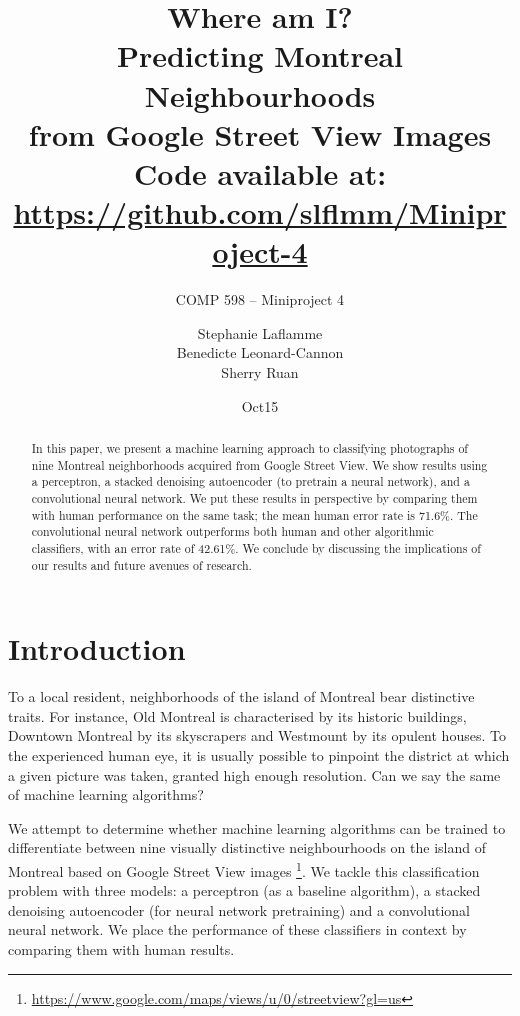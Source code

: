 \documentclass{acm_proc_article-sp}
\begin{document}
\title{Where am I? \\ Predicting Montreal Neighbourhoods \\from Google Street View Images  \\
{\normalsize Code available at: \url{https://github.com/slflmm/Miniproject-4}}} 
\subtitle{COMP 598 -- Miniproject 4}

\author{
\alignauthor 
Stephanie Laflamme\\
\alignauthor
Benedicte Leonard-Cannon\\
\alignauthor Sherry Ruan\\
}

\date{Oct15}



\maketitle
\begin{abstract}
In this paper, we present a machine learning approach to classifying photographs of nine Montreal neighborhoods acquired from Google Street View. We show results using a perceptron, a stacked denoising autoencoder (to pretrain a neural network), and a convolutional neural network. We put these results in perspective by comparing them with human performance on the same task; the mean human error rate is 71.6\%. The convolutional neural network outperforms both human and other algorithmic classifiers, with an error rate of 42.61\%. We conclude by discussing the implications of our results and future avenues of research. 


\end{abstract}

\section{Introduction}%
To a local resident, neighborhoods of the island of Montreal bear distinctive traits. For instance, Old Montreal is characterised by its historic buildings, Downtown Montreal by its skyscrapers and Westmount by its opulent houses. To the experienced human eye, it is usually possible to pinpoint the district at which a given picture was taken, granted high enough resolution. Can we say the same of machine learning algorithms?  

We attempt to determine whether machine learning algorithms can be trained to differentiate between nine visually distinctive neighbourhoods on the island of Montreal based on Google Street View images \footnote{\url{https://www.google.com/maps/views/u/0/streetview?gl=us}}. We tackle this classification problem with three models: a perceptron (as a baseline algorithm), a stacked denoising autoencoder (for neural network pretraining) and a convolutional neural network. We place the performance of these classifiers in context by comparing them with human results.
\end{document}
